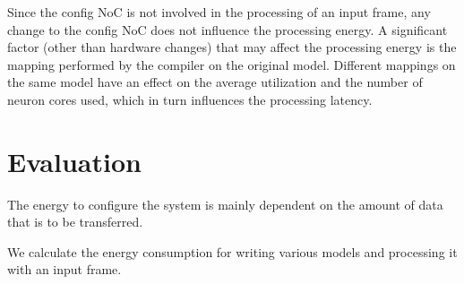 Since the config NoC is not involved in the processing of an input frame, any change to the config NoC does not influence the processing energy.
A significant factor (other than hardware changes) that may affect the processing energy is the mapping performed by the compiler on the original model. 
Different mappings on the same model have an effect on the average utilization and the number of neuron cores used, which in turn influences the processing latency.

\section{Evaluation}
The energy to configure the system is mainly dependent on the amount of data that is to be transferred.



\lipsum[1]

We calculate the energy consumption for writing various models and processing it with an input frame.

